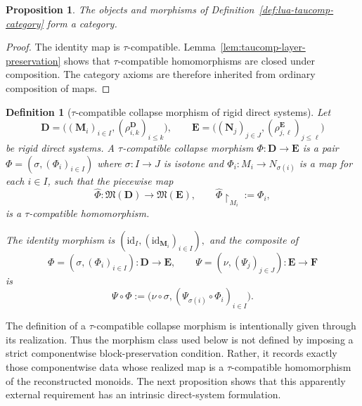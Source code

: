 \documentclass[pdflatex,sn-mathphys-num]{sn-jnl}
\theoremstyle{thmstyleone}%
\newtheorem{proposition}[theorem]{Proposition}
\theoremstyle{thmstyletwo}%
\theoremstyle{thmstylethree}%
\newtheorem{definition}[theorem]{Definition}
\begin{document}
\begin{proposition}\label{prop:lua-taucomp-category}
The objects and morphisms of Definition~\ref{def:lua-taucomp-category} form a category.
\end{proposition}

\begin{proof}
The identity map is \(\tau\)-compatible.
Lemma~\ref{lem:taucomp-layer-preservation} shows that \(\tau\)-compatible homomorphisms are closed under composition.
The category axioms are therefore inherited from ordinary composition of maps.
\end{proof}

\begin{definition}[\(\tau\)-compatible collapse morphism of rigid direct systems]
\label{def:taucomp-collapse-rigds-morphism}
Let
\[
\mathbf D=\bigl((\mathbf M_i)_{i\in I},(\rho^{\mathbf D}_{i,k})_{i\le k}\bigr),
\qquad
\mathbf E=\bigl((\mathbf N_j)_{j\in J},(\rho^{\mathbf E}_{j,\ell})_{j\le \ell}\bigr)
\]
be rigid direct systems.
A \emph{\(\tau\)-compatible collapse morphism} \(\Phi\colon\mathbf D\to\mathbf E \) is a pair \(\Phi=(\sigma,(\Phi_i)_{i\in I}) \) where \(\sigma\colon I\to J\) is isotone and \(\Phi_i\colon M_i\to N_{\sigma(i)}\) is a map for each \(i\in I\), such that the piecewise map
\[
\widehat\Phi\colon\mathfrak M(\mathbf D)\to\mathfrak M(\mathbf E),
\qquad
\widehat\Phi\!\upharpoonright_{M_i}:=\Phi_i,
\]
is a \(\tau\)-compatible homomorphism.

The identity morphism is \((\mathrm{id}_I,(\mathrm{id}_{\mathbf M_i})_{i\in I}), \) and the composite of
\[
\Phi=(\sigma,(\Phi_i)_{i\in I})\colon\mathbf D\to\mathbf E,
\qquad
\Psi=(\nu,(\Psi_j)_{j\in J})\colon\mathbf E\to\mathbf F
\]
is
\[
\Psi\circ\Phi
:=
\bigl(\nu\circ\sigma,(\Psi_{\sigma(i)}\circ\Phi_i)_{i\in I}\bigr).
\]
\end{definition}

The definition of a \(\tau\)-compatible collapse morphism is intentionally given through its realization.
Thus the morphism class used below is not defined by imposing a strict componentwise block-preservation condition.
Rather, it records exactly those componentwise data whose realized map is a \(\tau\)-compatible homomorphism of the reconstructed monoids.
The next proposition shows that this apparently external requirement has an intrinsic direct-system formulation.
\end{document}
